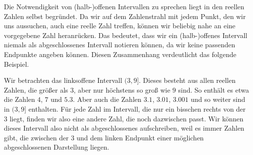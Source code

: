 \documentclass[../../main.tex]{subfiles}
\begin{document}
	
	Die Notwendigkeit von (halb-)offenen Intervallen zu sprechen liegt in den reellen Zahlen selbst begründet. Da wir auf dem Zahlenstrahl mit jedem Punkt, den wir uns aussuchen, auch eine reelle Zahl treffen, können wir beliebig nahe an eine vorgegebene Zahl heranrücken. Das bedeutet, dass wir ein (halb-)offenes Intervall niemals als abgeschlossenes Intervall notieren können, da wir keine passenden Endpunkte angeben können. Diesen Zusammenhang verdeutlicht das folgende Beispiel.
	
	\begin{example}{}
		Wir betrachten das linksoffene Intervall $(3,9]$. Dieses besteht aus allen reellen Zahlen, die größer als $3$, aber nur höchstens so groß wie $9$ sind. So enthält es etwa die Zahlen $4$, $7$ und $5.3$. Aber auch die Zahlen $3.1$, $3.01$, $3.001$ und so weiter sind in $(3,9]$ enthalten. Für jede Zahl im Intervall, die nur ein bisschen rechts von der $3$ liegt, finden wir also eine andere Zahl, die noch dazwischen passt. Wir können dieses Intervall also nicht als abgeschlossenes aufschreiben, weil es immer Zahlen gibt, die zwischen der $3$ und dem linken Endpunkt einer möglichen abgeschlossenen Darstellung liegen.
	\end{example}
\end{document}
